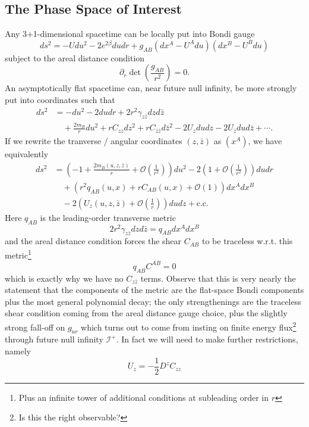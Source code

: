 \documentclass[11pt,letterpaper]{article}
\newcommand{\LP}{\left(}
\newcommand{\RP}{\right)}
\newcommand{\mc}[1]{\mathcal{#1}}
\newcommand{\D}{\partial}
\begin{document}
\subsection{The Phase Space of Interest}
Any 3+1-dimensional spacetime can be locally put into Bondi gauge \begin{equation}
ds^2 = - U du^2 - 2 e^{2 \beta} du dr + g_{AB} (dx^A - U^A du )(dx^B - U^B du)
\end{equation}
subject to the areal distance condition \begin{equation}
\D_r \det \LP \frac{g_{AB}}{r^2} \RP = 0.
\end{equation}
An asymptotically flat spacetime can, near future null infinity, be more strongly put into coordinates such that \begin{equation}\label{futureafmetric}
\begin{aligned}
ds^2 & = - du^2 - 2 du dr + 2 r^2 \gamma_{z \bar{z}} dz d \bar{z} \\
& \quad + \frac{2m_B}{r} du^2 + r C_{zz} dz^2 + r C_{\bar{z} \bar{z}} d \bar{z}^2 - 2 U_z du dz - 2 U_{\bar{z}} du d \bar{z} + \cdots.
\end{aligned}
\end{equation}
If we rewrite the tranverse / angular coordinates $(z, \bar{z})$ as $(x^A)$, we have equivalently  \begin{equation}
\begin{aligned}
ds^2 & = \LP - 1 + \frac{ 2m_B(u, z, \bar{z})}{r} + \mc{O} \LP \frac{1}{r^2} \RP \RP du^2 - 2 \LP 1 + \mc{O} \LP \frac{1}{r^2} \RP \RP du dr \\
& \quad + \LP r^2 q_{AB}(u, x) + r C_{AB}(u, x) + \mc{O} (1) \RP dx^A dx^B \\
& \quad -2 \LP U_z(u, z, \bar{z}) + \mc{O} \LP \frac{1}{r} \RP \RP du dz + \mbox{c.c.}
\end{aligned}
\end{equation}
Here $q_{AB}$ is the leading-order transverse metric \begin{equation}
2 r^2 \gamma_{z \bar{z}} dz d \bar{z} = q_{AB} dx^A dx^B
\end{equation}
and the areal distance condition forces the shear $C_{AB}$ to be traceless w.r.t. this metric\footnote{Plus an infinite tower of additional conditions at subleading order in $r$} \begin{equation}
q_{AB} C^{AB} = 0 
\end{equation}
which is exactly why we have no $C_{z \bar{z}}$ terms. Observe that this is very nearly the statement that the components of the metric are the flat-space Bondi components plus the most general polynomial decay; the only strengthenings are the traceless shear condition coming from the areal distance gauge choice, plus the slightly strong fall-off on $g_{ur}$ which turns out to come from insting on finite energy flux\footnote{Is this the right observable?} through future null infinity $\mc{I}^+$. In fact we will need to make further restrictions, namely \begin{equation}
U_z = - \frac{1}{2} D^z C_{zz}
\end{equation}
\end{document}
